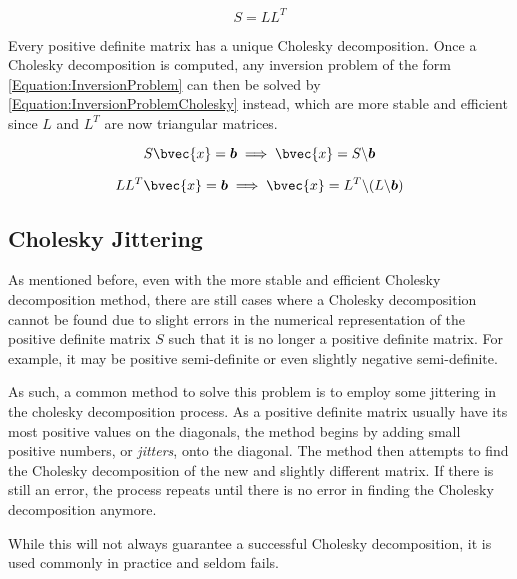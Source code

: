 			\begin{equation}
				S = L L^{T}
			\label{Equation:CholeskyDecomposition}
			\end{equation}
			
			Every positive definite matrix has a unique Cholesky decomposition. Once a Cholesky decomposition is computed, any inversion problem of the form \eqref{Equation:InversionProblem} can then be solved by \eqref{Equation:InversionProblemCholesky} instead, which are more stable and efficient since $L$ and $L^{T}$ are now triangular matrices.
			
			\begin{equation}
				S \bvec{x} = \vec{b} \implies \bvec{x} = S \backslash \vec{b}
			\label{Equation:InversionProblem}
			\end{equation}
			
			\begin{equation}
				L L^{T} \bvec{x} = \vec{b} \implies \bvec{x} = L^{T} \backslash (L \backslash \vec{b})
			\label{Equation:InversionProblemCholesky}
			\end{equation}
			
		\subsection{Cholesky Jittering}
		\label{Appendix:ComputationalAspects:NumericalStability:CholeskyJittering}

			As mentioned before, even with the more stable and efficient Cholesky decomposition method, there are still cases where a Cholesky decomposition cannot be found due to slight errors in the numerical representation of the positive definite matrix $S$ such that it is no longer a positive definite matrix. For example, it may be positive semi-definite or even slightly negative semi-definite.
			
			As such, a common method to solve this problem is to employ some jittering in the cholesky decomposition process. As a positive definite matrix usually have its most positive values on the diagonals, the method begins by adding small positive numbers, or \textit{jitters}, onto the diagonal. The method then attempts to find the Cholesky decomposition of the new and slightly different matrix. If there is still an error, the process repeats until there is no error in finding the Cholesky decomposition anymore.
			
			While this will not always guarantee a successful Cholesky decomposition, it is used commonly in practice and seldom fails.
			
